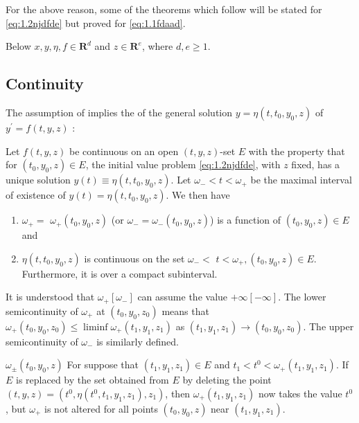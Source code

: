 \documentclass{article}
\begin{document}
For the above reason, some of the theorems which follow will be stated for \cref{eq:1.2njdfde} but proved for \cref{eq:1.1fdaad}.

Below $x, y, \eta, f \in \mathbf{R}^{d}$ and $z \in \mathbf{R}^{e}$, where $d, e \ge 1$.

\subsection{Continuity}
The assumption of  implies the  of the general solution $y=\eta\left(t, t_{0}, y_{0}, z\right)$ of $y^{\prime}=f(t, y, z)$ :

\begin{thma}\label{thm:jdnca}
Let $f(t, y, z)$ be continuous on an open $(t, y, z)$-set $E$ with the property that for  $\left(t_{0}, y_{0}, z\right) \in E$, the initial value problem \cref{eq:1.2njdfde}, with $z$ fixed, has a unique solution $y(t) \equiv \eta\left(t, t_{0}, y_{0}, z\right)$. Let $\omega_{-}<t<\omega_{+}$ be the maximal interval of existence of $y(t)=\eta\left(t, t_{0}, y_{0}, z\right)$. We then  have 
\begin{enumerate}[1)]
    \item $\omega_{+}=$ $\omega_{+}\left(t_{0}, y_{0}, z\right)$ (or $\omega_{-}=\omega_{-}\left(t_{0}, y_{0}, z\right)$) is a  function of $\left(t_{0}, y_{0}, z\right) \in E$ and
    \item $\eta\left(t, t_{0}, y_{0}, z\right)$ is continuous on the set $\omega_{-}<$ $t<\omega_{+},\left(t_{0}, y_{0}, z\right) \in E$. Furthermore, it is  over a compact subinterval.
\end{enumerate} 
\end{thma} 
\begin{rema}
It is understood that $\omega_{+}\left[\omega_{-}\right]$ can assume the value $+\infty[-\infty]$. The lower semicontinuity of $\omega_{+}$ at $\left(t_{0}, y_{0}, z_{0}\right)$ means that  $\omega_{+}\left(t_{0}, y_{0}, z_{0}\right) \le \liminf \omega_{+}\left(t_{1}, y_{1}, z_{1}\right)$ as $\left(t_{1}, y_{1}, z_{1}\right) \rightarrow\left(t_{0}, y_{0}, z_{0}\right)$. The upper semicontinuity of $\omega_{-}$ is similarly defined.

$\omega_{\pm}\left(t_{0}, y_{0}, z\right)$  For suppose that $\left(t_{1}, y_{1}, z_{1}\right) \in E$ and $t_{1}<t^{0}<\omega_{+}\left(t_{1}, y_{1}, z_{1}\right)$. If $E$ is replaced by the set obtained from $E$ by deleting the point $(t, y, z)=\left(t^{0}, \eta\left(t^{0}, t_{1}, y_{1}, z_{1}\right), z_{1}\right)$, then $\omega_{+}\left(t_{1}, y_{1}, z_{1}\right)$ now takes the value $t^{0}$, but $\omega_{+}$ is not altered for all points $\left(t_{0}, y_{0}, z\right)$ near $\left(t_{1}, y_{1}, z_{1}\right)$.
\end{rema}
\end{document}
